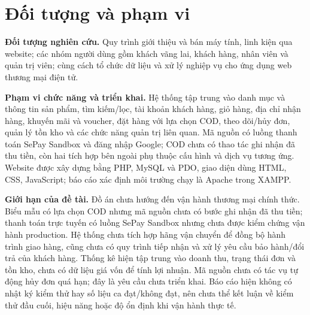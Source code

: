 \section{Đối tượng và phạm vi}
\noindent\textbf{Đối tượng nghiên cứu.} Quy trình giới thiệu và bán máy tính, linh kiện qua website; các nhóm người dùng gồm khách vãng lai, khách hàng, nhân viên và quản trị viên; cùng cách tổ chức dữ liệu và xử lý nghiệp vụ cho ứng dụng web thương mại điện tử.

\noindent\textbf{Phạm vi chức năng và triển khai.} Hệ thống tập trung vào danh mục và thông tin sản phẩm, tìm kiếm/lọc, tài khoản khách hàng, giỏ hàng, địa chỉ nhận hàng, khuyến mãi và voucher, đặt hàng với lựa chọn COD, theo dõi/hủy đơn, quản lý tồn kho và các chức năng quản trị liên quan. Mã nguồn có luồng thanh toán SePay Sandbox và đăng nhập Google; COD chưa có thao tác ghi nhận đã thu tiền, còn hai tích hợp bên ngoài phụ thuộc cấu hình và dịch vụ tương ứng. Website được xây dựng bằng PHP, MySQL và PDO, giao diện dùng HTML, CSS, JavaScript; báo cáo xác định môi trường chạy là Apache trong XAMPP.

\noindent\textbf{Giới hạn của đề tài.} Đồ án chưa hướng đến vận hành thương mại chính thức. Biểu mẫu có lựa chọn COD nhưng mã nguồn chưa có bước ghi nhận đã thu tiền; thanh toán trực tuyến có luồng SePay Sandbox nhưng chưa được kiểm chứng vận hành production. Hệ thống chưa tích hợp hãng vận chuyển để đồng bộ hành trình giao hàng, cũng chưa có quy trình tiếp nhận và xử lý yêu cầu bảo hành/đổi trả của khách hàng. Thống kê hiện tập trung vào doanh thu, trạng thái đơn và tồn kho, chưa có dữ liệu giá vốn để tính lợi nhuận. Mã nguồn chưa có tác vụ tự động hủy đơn quá hạn; đây là yêu cầu chưa triển khai. Báo cáo hiện không có nhật ký kiểm thử hay số liệu ca đạt/không đạt, nên chưa thể kết luận về kiểm thử đầu cuối, hiệu năng hoặc độ ổn định khi vận hành thực tế.


